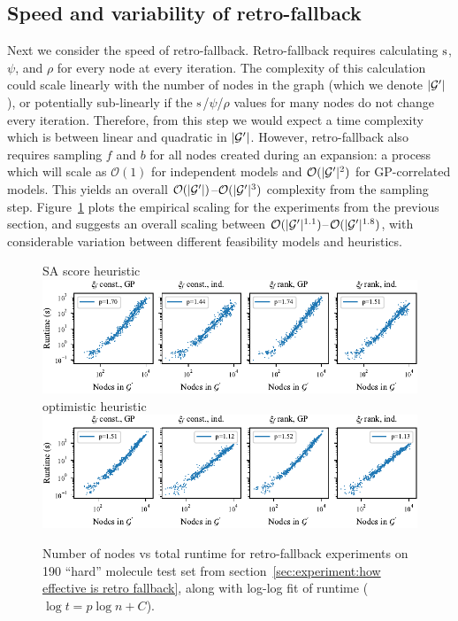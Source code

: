 \clearpage
\subsection{Speed and variability of retro-fallback}
\label{sec:experiment:speed and variability}

Next we consider the speed of retro-fallback.
Retro-fallback requires calculating ${\textnormal{s}}$,
$\psi$, and $\rho$ for every node at every iteration.
The complexity of this calculation could scale linearly
with the number of nodes in the graph (which we denote $|{\mathcal{G}}'|$),
or potentially sub-linearly if the ${\textnormal{s}}$/$\psi$/$\rho$
values for many nodes do not change every iteration.
Therefore, from this step we would expect a time complexity
which is between linear and quadratic in $|{\mathcal{G}}'|$.
However, retro-fallback also requires sampling $f$
and $b$ for all nodes created during an expansion:
a process which will scale as $\mathcal O(1)$
for independent models
and $\mathcal O (|{\mathcal{G}}'|^2)$ for GP-correlated models.
This yields an overall  $\mathcal O (|{\mathcal{G}}'|)$--$\mathcal O (|{\mathcal{G}}'|^3)$
complexity from the sampling step.
Figure~\ref{fig:retro-fallback runtimes}
plots the empirical scaling for the experiments from the previous
section, and suggests an overall scaling between
$\mathcal O(|{\mathcal{G}}'|^{1.1})$--$\mathcal O(|{\mathcal{G}}'|^{1.8})$,
with considerable variation between different feasibility models
and heuristics.
\begin{figure}[ht]
    \centering
    {SA score heuristic} \\
    \vspace{0.3cm}
    \includegraphics{figures/comparison/retrostar190/runtimes_sascore.pdf} \\
    \vspace{0.3cm}
    {optimistic heuristic} \\
    \vspace{0.3cm}
    \includegraphics{figures/comparison/retrostar190/runtimes_optimistic.pdf}
    \caption[Time complexity of retro-fallback.]{
        Number of nodes vs total runtime
        for retro-fallback experiments
        on 190 ``hard'' molecule test set
        from section~\ref{sec:experiment:how effective is retro fallback},
        along with log-log fit of runtime 
        ($\log t=p\log{n} + C $).
    }
    \label{fig:retro-fallback runtimes}
\end{figure}

